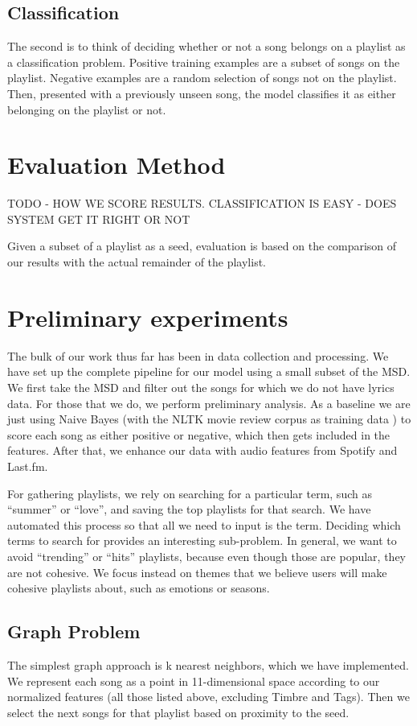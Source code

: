 \documentclass[10pt,journal,compsoc]{IEEEtran}
\begin{document}
\subsection{Classification}
The second is to think of deciding whether or not a song belongs on a playlist as a classification problem. Positive training examples are a subset of songs on the playlist. Negative examples are a random selection of songs not on the playlist. Then, presented with a previously unseen song, the model classifies it as either belonging on the playlist or not.

\section{Evaluation Method}
TODO - HOW WE SCORE RESULTS. CLASSIFICATION IS EASY - DOES SYSTEM GET IT RIGHT OR NOT

Given a subset of a playlist as a seed, evaluation is based on the comparison of our results with the actual remainder of the playlist.

\section{Preliminary experiments}
The bulk of our work thus far has been in data collection and processing. We have set up the complete pipeline for our model using a small subset of the MSD. We first take the MSD and filter out the songs for which we do not have lyrics data. For those that we do, we perform preliminary analysis. As a baseline we are just using Naive Bayes (with the NLTK movie review corpus as training data \cite{nltk}) to score each song as either positive or negative, which then gets included in the features. After that, we enhance our data with audio features from Spotify and Last.fm.

For gathering playlists, we rely on searching for a particular term, such as ``summer'' or ``love'', and saving the top playlists for that search. We have automated this process so that all we need to input is the term. Deciding which terms to search for provides an interesting sub-problem. In general, we want to avoid ``trending'' or ``hits'' playlists, because even though those are popular, they are not cohesive. We focus instead on themes that we believe users will make cohesive playlists about, such as emotions or seasons.

\subsection{Graph Problem}
The simplest graph approach is k nearest neighbors, which we have implemented. We represent each song as a point in 11-dimensional space according to our normalized features (all those listed above, excluding Timbre and Tags). Then we select the next songs for that playlist based on proximity to the seed.
\end{document}
